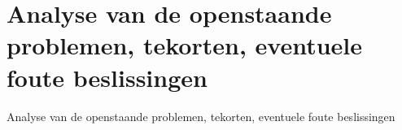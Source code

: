 
\chapter{Analyse van de openstaande problemen, tekorten, eventuele foute beslissingen}

Analyse van de openstaande problemen, tekorten, eventuele foute beslissingen